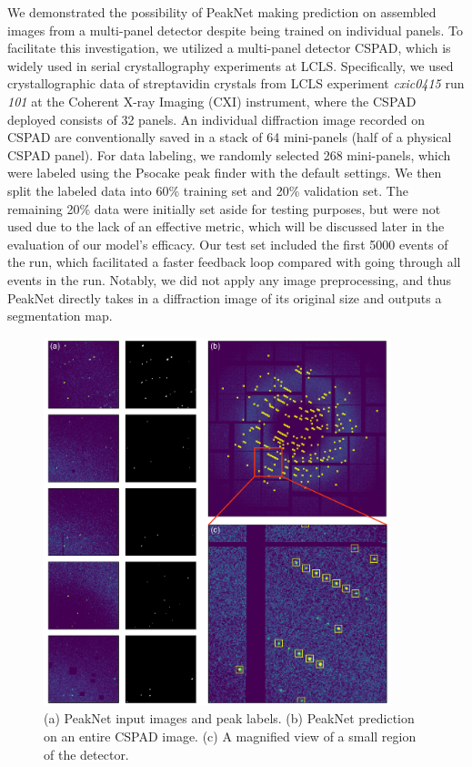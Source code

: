 \documentclass[conference]{IEEEtran}
\newcommand{\peaknet}{PeakNet}
\newcommand{\psocake}{Psocake}
\begin{document}
We demonstrated the possibility of \peaknet{} making prediction on assembled
images from a multi-panel detector despite being trained on individual panels.
To facilitate this investigation, we utilized a multi-panel detector CSPAD,
which is widely used in serial crystallography experiments at LCLS.
Specifically, we used crystallographic data of streptavidin crystals from LCLS experiment
\textit{cxic0415} run \textit{101} at the Coherent X-ray Imaging (CXI)
instrument, where the CSPAD deployed consists of 32 panels.  An individual
diffraction image recorded on CSPAD are conventionally saved in a stack of 64
mini-panels (half of a physical CSPAD panel).  For data labeling, we randomly
selected 268 mini-panels, which were labeled using the \psocake{} peak finder
with the default settings.  We then split the labeled data into 60\% training
set and 20\% validation set.  The remaining 20\% data were initially set aside
for testing purposes, but were not used due to the lack of an effective metric,
which will be discussed later in the evaluation of our model's efficacy.  Our
test set included the first 5000 events of the run, which facilitated a faster
feedback loop compared with going through all events in the run.  Notably, we
did not apply any image preprocessing, and thus \peaknet{} directly takes in a
diffraction image of its original size and outputs a segmentation map.

\begin{figure}[htbp]
\centering
\includegraphics[width=0.9\textwidth,keepaspectratio]
{./figures/label_to_predict_with_zoom.pdf}
\caption{(a) \peaknet{} input images and peak labels.  (b) \peaknet{} prediction
on an entire CSPAD image.  (c) A magnified view of a small region of the
detector.}
\label{fig : label and predict}
\end{figure}
\end{document}
